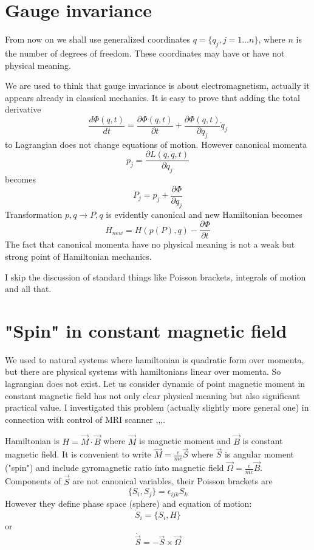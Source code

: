 \section{Gauge invariance} 
\label{cm:gi}

From now on we shall use generalized coordinates $ q=\{q_j, j=1\ldots n\} $, where $ n $ is the number of
degrees of freedom. These coordinates may have or have not physical meaning.

We are used to think that gauge invariance is about electromagnetism, actually it appears
already in classical mechanics. It is easy to prove that adding the total derivative
\begin{equation}
   \label {tot-der}
    \frac{d \Phi (q,t)}{d t}=\frac{\partial \Phi(q,t)}{\partial t} + \frac{ \partial \Phi (q,t)}{\partial q_j} \dot q_j
\end{equation}
to Lagrangian does not change equations of motion. However canonical momenta
\begin{equation}
   \label {can-mom}
   p_j=\frac{ \partial L(q,\dot q,t)}{\partial \dot q_j}
\end{equation}
becomes \[ P_j=p_j+\frac{\partial \Phi}{\partial q_j} \] Transformation $ p,q \rightarrow P,q $ is evidently
canonical and new Hamiltonian becomes 
\[ H_{new}=H(p(P),q)- \frac{\partial \Phi}{\partial t}\]
The fact that canonical momenta have no physical meaning is not a weak but strong point of Hamiltonian 
mechanics.

I skip the  discussion of standard things like Poisson brackets, integrals of motion and all that.

\section{"Spin" in constant magnetic field}
\label{cm:mm}
We used to natural systems where hamiltonian is quadratic form over momenta,
but there are physical systems with hamiltonians linear over momenta.
So lagrangian does not exist. Let us consider 
dynamic of point magnetic moment in constant magnetic field has not only
clear physical meaning but also significant practical value. I investigated
this problem (actually slightly more general one) in connection with control of MRI
scanner \cite{RPZ4},\cite{RPZ3},\cite{RPZ2},\cite{RPZ1}.


Hamiltonian is $ H=\vec M \cdot \vec B $ where $\vec M$ is magnetic moment 
and $ \vec B $ is constant magnetic field.
It is convenient to write $ \vec M=\frac{e}{m c}\vec S $ where $ \vec S $
is angular moment ("spin")  and  include gyromagnetic ratio into magnetic field
$ \vec \Omega = \frac{e}{m c}\vec B$. Components of $ \vec S $ are not
canonical variables, their Poisson brackets are
\begin{equation}
   \label {pb}
    \{S_i,S_j\}= \epsilon_{ijk} S_k
\end{equation}
However they define phase space (sphere)  and equation of motion:
\begin{equation}
   \label {sp1}
    \dot S_i=\{S_i,H\}
\end{equation} 
or 
\begin{equation}
   \label {sp2}
    \dot {\vec S} =-\vec S \times \vec \Omega
\end{equation}

